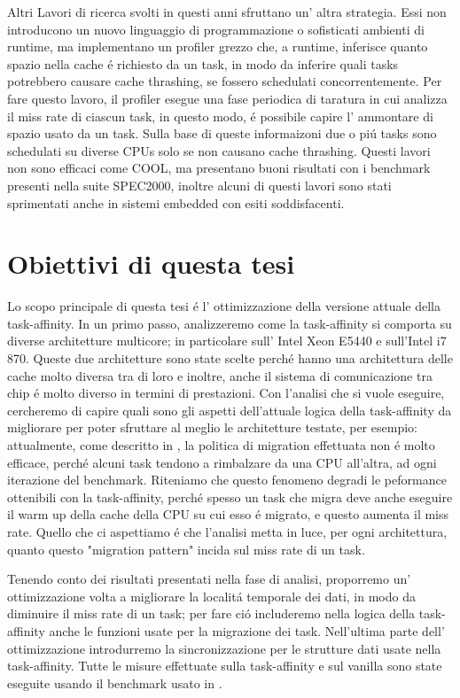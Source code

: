 Altri Lavori di ricerca svolti in questi anni sfruttano un' altra strategia. Essi non introducono un nuovo linguaggio di programmazione o sofisticati 
ambienti di runtime, ma implementano un profiler grezzo che, a runtime, inferisce quanto spazio nella cache \'e richiesto da un task, in modo da inferire 
quali tasks potrebbero causare cache thrashing, se fossero schedulati concorrentemente. Per fare questo lavoro, il profiler esegue una fase periodica di
taratura in cui analizza il miss rate di ciascun task, in questo modo, \'e possibile capire l' ammontare di spazio usato da un task. Sulla base di queste
informaizoni due o pi\'u tasks sono schedulati su diverse CPUs solo se non causano cache thrashing. Questi lavori non sono efficaci come COOL, ma presentano
buoni risultati con i benchmark presenti nella suite SPEC2000, inoltre alcuni di questi lavori sono stati sprimentati anche in sistemi embedded con esiti
soddisfacenti.

\section{Obiettivi di questa tesi}
\label{sec:ObbiettiviTesi}

Lo scopo principale di questa tesi \'e l' ottimizzazione della versione attuale della task-affinity. In un primo passo, analizzeremo come la task-affinity 
si comporta su diverse architetture multicore; in particolare sull' Intel Xeon E5440 e sull'Intel i7 870. Queste due architetture sono state scelte
perch\'e hanno una architettura delle cache molto diversa tra di loro e inoltre, anche il sistema di comunicazione tra chip \'e molto diverso in termini
di prestazioni. Con l'analisi che si vuole eseguire, cercheremo di capire quali sono gli aspetti dell'attuale logica della task-affinity da migliorare per
poter sfruttare al meglio le architetture testate, per esempio: attualmente, come descritto in \cite{lcs}, la politica di migration effettuata non \'e 
molto efficace, perch\'e alcuni task tendono a rimbalzare da una CPU all'altra, ad ogni iterazione del benchmark. Riteniamo che questo fenomeno degradi
le peformance ottenibili con la task-affinity, perch\'e spesso un task che migra deve anche eseguire il warm up della cache della CPU su cui esso \'e
migrato, e questo aumenta il miss rate. Quello che ci aspettiamo \'e che l'analisi metta in luce, per ogni architettura, quanto questo "migration pattern" 
incida sul miss rate di un task.

Tenendo conto dei risultati presentati nella fase di analisi, proporremo un' ottimizzazione volta a migliorare la localit\'a temporale dei dati, in modo da
diminuire il miss rate di un task; per fare ci\'o includeremo nella logica della task-affinity anche le funzioni usate per la migrazione dei task. 
Nell'ultima parte dell' ottimizzazione introdurremo la sincronizzazione per le strutture dati usate nella task-affinity. Tutte le misure effettuate sulla 
task-affinity e sul vanilla sono state eseguite usando il benchmark usato in \cite{lcs}.

